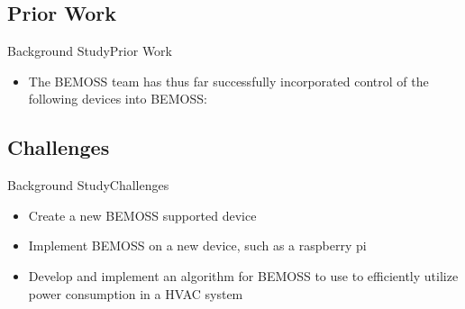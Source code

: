 \documentclass{beamer}
\begin{document}

\subsection{Prior Work}

\begin{frame}{Background Study}{Prior Work}
    \begin{itemize}
      \item The BEMOSS team has thus far successfully incorporated control of the following devices into BEMOSS: 
    \end{itemize}
      \begin{figure}
  \label{fig:Remote Motor Circuit}
        \end{figure}
    

\end{frame}

\subsection{Challenges}
\begin{frame}{Background Study}{Challenges}
    \begin{itemize}
        \item Create a new BEMOSS supported device
        \item Implement BEMOSS on a new device, such as a raspberry pi
        \item Develop and implement an algorithm for BEMOSS to use to efficiently utilize power consumption in a HVAC system 
    \end{itemize}
  
\end{frame}
\end{document}
